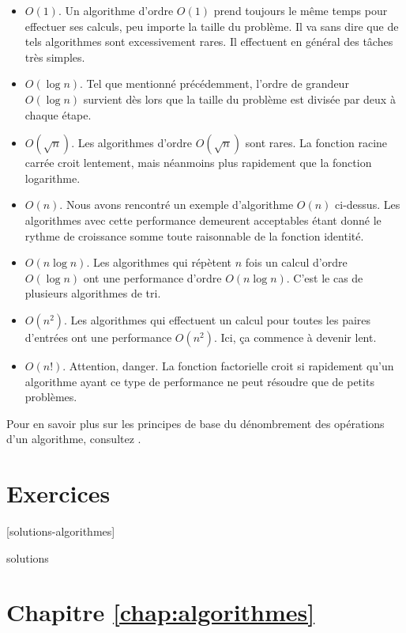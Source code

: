 \begin{itemize}
\item $O(1)$. Un algorithme d'ordre $O(1)$ prend toujours le même
  temps pour effectuer ses calculs, peu importe la taille du problème.
  Il va sans dire que de tels algorithmes sont excessivement rares. Il
  effectuent en général des tâches très simples.
\item $O(\log n)$. Tel que mentionné précédemment, l'ordre de grandeur
  $O(\log n)$ survient dès lors que la taille du problème est divisée
  par deux à chaque étape.
\item $O(\sqrt{n})$. Les algorithmes d'ordre $O(\sqrt{n})$ sont rares.
  La fonction racine carrée croit lentement, mais néanmoins plus
  rapidement que la fonction logarithme.
\item $O(n)$. Nous avons rencontré un exemple d'algorithme $O(n)$
  ci-dessus. Les algorithmes avec cette performance demeurent
  acceptables étant donné le rythme de croissance somme toute
  raisonnable de la fonction identité.
\item $O(n \log n)$. Les algorithmes qui répètent $n$ fois un calcul
  d'ordre $O(\log n)$ ont une performance d'ordre $O(n \log n)$.
  C'est le cas de plusieurs algorithmes de tri.
\item $O(n^2)$. Les algorithmes qui effectuent un calcul pour toutes
  les paires d'entrées ont une performance $O(n^2)$. Ici, ça commence
  à devenir lent.
\item $O(n!)$. Attention, danger. La fonction factorielle croit si
  rapidement qu'un algorithme ayant ce type de performance ne peut
  résoudre que de petits problèmes.
\end{itemize}

Pour en savoir plus sur les principes de base du dénombrement des
opérations d'un algorithme, consultez
\citet[chapitre~1]{Stephens:algorithms:2013}.



\section{Exercices}
\label{sec:algorithmes:exercices}

[solutions-algorithmes]

\begin{Filesave}{solutions}
\section*{Chapitre \ref*{chap:algorithmes}}

\begingroup

\end{Filesave}

